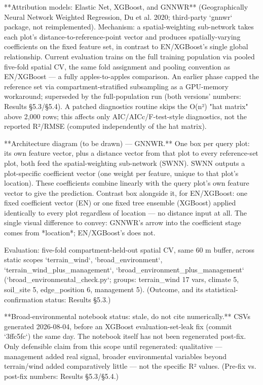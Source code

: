 **Attribution models: Elastic Net, XGBoost, and GNNWR** (Geographically Neural Network Weighted Regression, Du et al. 2020; third-party `gnnwr` package, not reimplemented). Mechanism: a spatial-weighting sub-network takes each plot's distance-to-reference-point vector and produces spatially-varying coefficients on the fixed feature set, in contrast to EN/XGBoost's single global relationship. Current evaluation trains on the full training population via pooled five-fold spatial CV, the same fold assignment and pooling convention as EN/XGBoost — a fully apples-to-apples comparison. An earlier phase capped the reference set via compartment-stratified subsampling as a GPU-memory workaround; superseded by the full-population run (both versions' numbers: Results §5.3/§5.4). A patched diagnostics routine skips the O(n²) "hat matrix" above 2,000 rows; this affects only AIC/AICc/F-test-style diagnostics, not the reported R²/RMSE (computed independently of the hat matrix).

**Architecture diagram (to be drawn) — GNNWR.** One box per query plot: its own feature vector, plus a distance vector from that plot to every reference-set plot, both feed the spatial-weighting sub-network (SWNN). SWNN outputs a plot-specific coefficient vector (one weight per feature, unique to that plot's location). These coefficients combine linearly with the query plot's own feature vector to give the prediction. Contrast box alongside it, for EN/XGBoost: one fixed coefficient vector (EN) or one fixed tree ensemble (XGBoost) applied identically to every plot regardless of location — no distance input at all. The single visual difference to convey: GNNWR's arrow into the coefficient stage comes from *location*; EN/XGBoost's does not.

Evaluation: five-fold compartment-held-out spatial CV, same 60 m buffer, across static scopes `terrain_wind`, `broad_environment`, `terrain_wind_plus_management`, `broad_environment_plus_management` (`broad_environmental_check.py`; groups: terrain_wind 17 vars, climate 5, soil_site 5, edge_position 6, management 5). (Outcome, and its statistical-confirmation status: Results §5.3.)

**Broad-environmental notebook status: stale, do not cite numerically.** CSVs generated 2026-08-04, before an XGBoost evaluation-set-leak fix (commit `3ffc5fc`) the same day. The notebook itself has not been regenerated post-fix. Only defensible claim from this scope until regenerated: qualitative — management added real signal, broader environmental variables beyond terrain/wind added comparatively little — not the specific R² values. (Pre-fix vs. post-fix numbers: Results §5.3/§5.4.)

